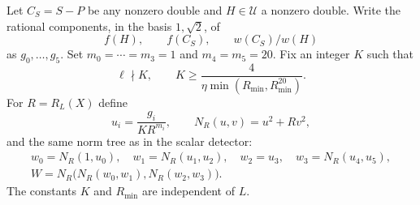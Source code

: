 \documentclass[11pt]{article}
\theoremstyle{remark}\newtheorem{remark}[theorem]{Remark}
\begin{document}
Let $C_S=S-P$ be any nonzero double and $H\in\mathcal U$ a nonzero
double.  Write the rational components, in the basis $1,\sqrt2$, of
\[
             f(H),\qquad f(C_S),\qquad w(C_S)/w(H)
\]
as $g_0,\ldots,g_5$.  Set $m_0=\cdots=m_3=1$ and
$m_4=m_5=20$.  Fix an integer $K$ such that
\begin{equation}\label{eq:K}
 \ell\nmid K,\qquad
 K\ge\frac{4}{\eta\min(R_{\min},R_{\min}^{20})}.
\end{equation}
For $R=R_L(X)$ define
\[
 u_i=\frac{g_i}{K R^{m_i}},\qquad N_R(u,v)=u^2+Rv^2,
\]
and the same norm tree as in the scalar detector:
\[
 \begin{gathered}
 w_0=N_R(1,u_0),\quad w_1=N_R(u_1,u_2),\quad
 w_2=u_3,\quad w_3=N_R(u_4,u_5),\\
 W=N_R\bigl(N_R(w_0,w_1),N_R(w_2,w_3)\bigr).
 \end{gathered}
\]
The constants $K$ and $R_{\min}$ are independent of $L$.
\end{document}
